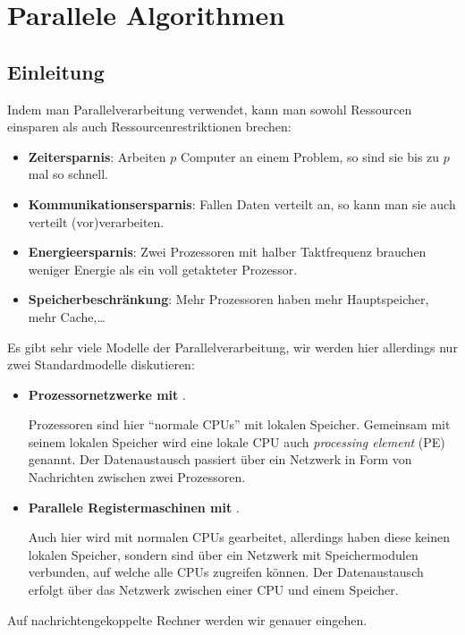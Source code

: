 \chapter{Parallele Algorithmen}

\section{Einleitung}

Indem man Parallelverarbeitung verwendet, kann man sowohl Ressourcen einsparen als auch Ressourcenrestriktionen brechen:
\begin{itemize}
  \item \textbf{Zeitersparnis}: Arbeiten \( p \) Computer an einem Problem, so sind sie bis zu \( p \) mal so schnell.
  \item \textbf{Kommunikationsersparnis}: Fallen Daten verteilt an, so kann man sie auch verteilt (vor)verarbeiten.
  \item \textbf{Energieersparnis}: Zwei Prozessoren mit halber Taktfrequenz brauchen weniger Energie als ein voll getakteter Prozessor.
  \item \textbf{Speicherbeschränkung}: Mehr Prozessoren haben mehr Hauptspeicher, mehr Cache,\dots
\end{itemize}

Es gibt sehr viele Modelle der Parallelverarbeitung, wir werden hier allerdings nur zwei Standardmodelle diskutieren:
\begin{itemize}
  \item \textbf{Prozessornetzwerke mit} .

    Prozessoren sind hier ``normale CPUs'' mit lokalen Speicher. Gemeinsam mit seinem lokalen Speicher wird eine lokale CPU auch \emph{processing element} (PE) genannt. Der Datenaustausch passiert über ein Netzwerk in Form von Nachrichten zwischen zwei Prozessoren.
  \item \textbf{Parallele Registermaschinen mit} .

    Auch hier wird mit normalen CPUs gearbeitet, allerdings haben diese keinen lokalen Speicher, sondern sind über ein Netzwerk mit Speichermodulen verbunden, auf welche alle CPUs zugreifen können. Der Datenaustausch erfolgt über das Netzwerk zwischen einer CPU und einem Speicher.
\end{itemize}

Auf nachrichtengekoppelte Rechner werden wir genauer eingehen.

